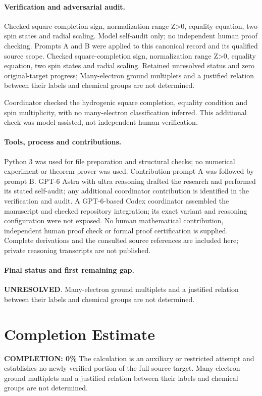 \documentclass[11pt]{article}
\begin{document}
\paragraph{Verification and adversarial audit.}
Checked square-completion sign, normalization range Z>0, equality equation, two spin states and radial scaling. Model self-audit only; no independent human proof checking. Prompts A and B were applied to this canonical record and its qualified source scope. Checked square-completion sign, normalization range Z>0, equality equation, two spin states and radial scaling. Retained unresolved status and zero original-target progress; Many-electron ground multiplets and a justified relation between their labels and chemical groups are not determined.

Coordinator checked the hydrogenic square completion, equality condition and spin multiplicity, with no many-electron classification inferred. This additional check was model-assisted, not independent human verification.

\paragraph{Tools, process and contributions.}
Python 3 was used for file preparation and structural checks; no numerical experiment or theorem prover was used. Contribution prompt A was followed by prompt B. GPT-6 Astra with ultra reasoning drafted the research and performed its stated self-audit; any additional coordinator contribution is identified in the verification and audit. A GPT-6-based Codex coordinator assembled the manuscript and checked repository integration; its exact variant and reasoning configuration were not exposed. No human mathematical contribution, independent human proof check or formal proof certification is supplied. Complete derivations and the consulted source references are included here; private reasoning transcripts are not published.

\paragraph{Final status and first remaining gap.}
\textbf{UNRESOLVED}. Many-electron ground multiplets and a justified relation between their labels and chemical groups are not determined.

\section{Completion Estimate}
\noindent\textbf{COMPLETION: 0\%}
The calculation is an auxiliary or restricted attempt and establishes no newly verified portion of the full source target. Many-electron ground multiplets and a justified relation between their labels and chemical groups are not determined.
\end{document}
